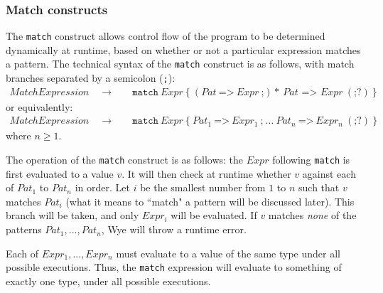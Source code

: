 \documentclass[a4paper, 12pt]{article}
\theoremstyle{myplain}
\theoremstyle{mydefinition}
\theoremstyle{myremark}
\numberwithin{equation} {section}
\numberwithin{figure}   {section}
\numberwithin{table}    {section}
\newcommand{\substo}{\quad\rightarrow\quad}
\begin{document}
\subsubsection{Match constructs}
The \texttt{match} construct allows control flow of the program to be determined dynamically at runtime, based on whether or not a particular expression matches a pattern. The technical syntax of the \texttt{match} construct is as follows, with match branches separated by a semicolon (\texttt{;}):
\begin{align*}
MatchExpression \substo& \texttt{match}\: Expr \: \texttt{\{} \: (Pat \: \texttt{=>}\: Expr\: \texttt{;})*\: Pat\texttt{ => } Expr \: (\texttt{;}?) \: \texttt{\}}
\end{align*}
or equivalently:
\begin{align*}
MatchExpression \substo& \texttt{match}\: Expr \: \texttt{\{} \: Pat_1 \: \texttt{=>}\: Expr_1\: \texttt{;} \:  ... \: Pat_n \: \texttt{=>}\: Expr_n\: (\texttt{;}?) \: \texttt{\}}
\end{align*}
where $n \geq 1$. 

The operation of the \texttt{match} construct is as follows: the $Expr$ following \texttt{match} is first evaluated to a value $v$. It will then check at runtime whether $v$ against each of $Pat_1$ to $Pat_n$ in order. Let $i$ be the smallest number from $1$ to $n$ such that $v$ matches $Pat_i$ (what it means to ``match" a pattern will be discussed later). This branch will be taken, and only $Expr_i$ will be evaluated. If $v$ matches \textit{none} of the patterns $Pat_1, ..., Pat_n$, Wye will throw a runtime error. 

Each of $Expr_1, ..., Expr_n$ must evaluate to a value of the same type under all possible executions. Thus, the \texttt{match} expression will evaluate to something of exactly one type, under all possible executions.
\end{document}
